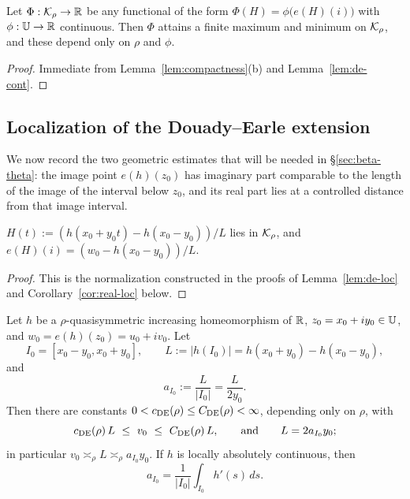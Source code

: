 \begin{corollary}\label{cor:compact-functionals}
	Let $\Phi:\mathcal{K}_\rho\to\mathbb{R}$ be any functional of the form
	$\Phi(H)=\phi\bigl(e(H)(i)\bigr)$ with $\phi:\mathbb{U}\to\mathbb{R}$ continuous. Then $\Phi$
	attains a finite maximum and minimum on $\mathcal{K}_\rho$, and these depend only on
	$\rho$ and $\phi$.
\end{corollary}

\begin{proof}
	Immediate from Lemma~\ref{lem:compactness}(b) and Lemma~\ref{lem:de-cont}.
\end{proof}

\subsection{Localization of the Douady--Earle extension}\label{ss:localization}

We now record the two geometric estimates that will be needed in
\S\ref{sec:beta-theta}: the image point $e(h)(z_0)$ has imaginary part
comparable to the length of the image of the interval below $z_0$, and its real
part lies at a controlled distance from that image interval.


\begin{lemma}\label{lem:normalizedLoc_mem_KFamily}
	$H(t):=(h(x_0+y_0t)-h(x_0-y_0))/L$ lies in $\mathcal{K}_\rho$, and
	$e(H)(i)=(w_0-h(x_0-y_0))/L$.
\end{lemma}
\begin{proof}
	This is the normalization constructed in the proofs of Lemma~\ref{lem:de-loc} and
	Corollary~\ref{cor:real-loc} below.
\end{proof}

\begin{lemma}[DE Localization]\label{lem:de-loc}
	Let $h$ be a $\rho$-quasisymmetric increasing homeomorphism of $\mathbb{R}$,
	$z_0=x_0+iy_0\in\mathbb{U}$, and $w_0=e(h)(z_0)=u_0+iv_0$. Let
	\[
	I_0=[x_0-y_0,x_0+y_0],
	\qquad
	L:=|h(I_0)|=h(x_0+y_0)-h(x_0-y_0),
	\]
	and
	\[
	a_{I_0}:=\frac{L}{|I_0|}=\frac{L}{2y_0}.
	\]
	Then there are constants $0<c_{\rm DE}(\rho)\le C_{\rm DE}(\rho)<\infty$,
	depending only on $\rho$, with
	\[
	c_{\rm DE}(\rho)\,L\ \le\ v_0\ \le\ C_{\rm DE}(\rho)\,L,
	\qquad\text{and}\qquad L=2a_{I_0}y_0 ;
	\]
	in particular $v_0\asymp_\rho L\asymp_\rho a_{I_0}y_0$.
	If $h$ is locally absolutely continuous, then
	\[
	a_{I_0}=\frac1{|I_0|}\int_{I_0}h'(s)\,ds.
	\]
\end{lemma}

